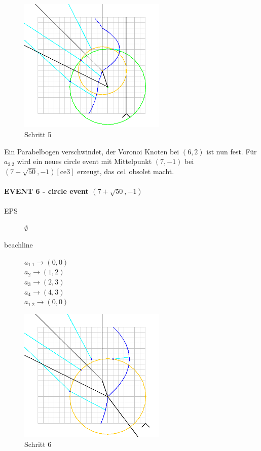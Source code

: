 \begin{figure}[h]
\begin{center}
\includegraphics[width=7cm]{capture5}
\end{center}
\caption{Schritt 5}
\label{fig:c5}
\end{figure}

Ein Parabelbogen verschwindet, der Voronoi Knoten bei $(6,2)$ ist nun fest. Für $a_{2.2}$ wird ein neues circle event mit Mittelpunkt $(7,-1)$ bei $(7 + \sqrt{50}, -1)[\text{ce3}]$ erzeugt, das $ce1$ obsolet macht.

\newpage

\paragraph*{EVENT 6 - circle event $(7 + \sqrt{50}, -1)$}
\begin{description}
\item[EPS] $\emptyset$
\item[beachline]
$a_{1.1} \rightarrow (0,0)$\\
$a_{2} \rightarrow (1,2)$\\
$a_{3} \rightarrow (2,3)$\\
$a_4 \rightarrow (4,3)$\\
$a_{1.2} \rightarrow (0,0)$
\end{description}

\begin{figure}[h]
\begin{center}
\includegraphics[width=7cm]{capture6}
\end{center}
\caption{Schritt 6}
\label{fig:c6}
\end{figure}

